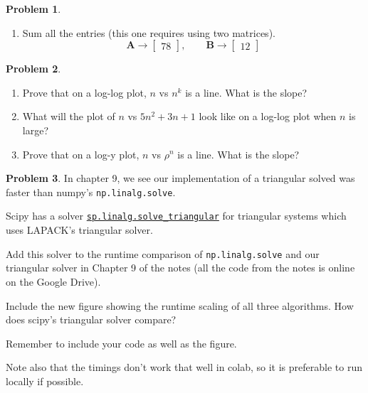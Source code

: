 \documentclass[12pt]{article}
\theoremstyle{definition}
\newtheorem{problem}{Problem}
\renewcommand{\vec}{\mathbf}
\begin{document}
\begin{problem}
\begin{enumerate}
    \item Sum all the entries (this one requires using two matrices).
    \[
        \vec{A} \to  
        \begin{bmatrix}
            78
        \end{bmatrix}
        ,\qquad 
        \vec{B} \to 
        \begin{bmatrix}
            12
        \end{bmatrix}
    \]

    \end{enumerate}
\end{problem}


\begin{problem}

    \begin{enumerate}
        \item Prove that on a log-log plot, $n$ vs $n^k$ is a line. What is the slope?
        \item What will the plot of $n$ vs $5n^2 + 3n + 1$ look like on a log-log plot when $n$ is large?
        \item Prove that on a log-y plot, $n$ vs $\rho^n$ is a line. What is the slope?
    \end{enumerate}

\end{problem}

\begin{problem}

    In chapter 9, we see our implementation of a triangular solved was faster than numpy's \lstinline{np.linalg.solve}.

    Scipy has a solver \href{https://docs.scipy.org/doc/scipy/reference/generated/scipy.linalg.solve_triangular.html}{\lstinline{sp.linalg.solve_triangular}} for triangular systems which uses LAPACK's triangular solver.

    Add this solver to the runtime comparison of \lstinline{np.linalg.solve} and our triangular solver in Chapter 9 of the notes (all the code from the notes is online on the Google Drive).
    
    Include the new figure showing the runtime scaling of all three algorithms.
    How does scipy's triangular solver compare?

    Remember to include your code as well as the figure.

    Note also that the timings don't work that well in colab, so it is preferable to run locally if possible.

\end{problem}
\end{document}
